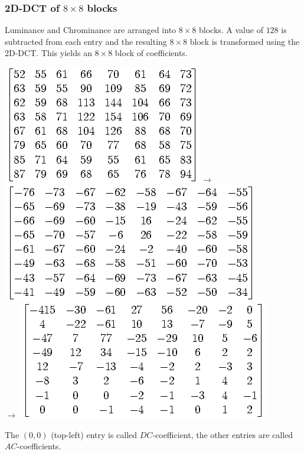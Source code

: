 \documentclass{beamer}
\begin{document}
\begin{frame}
\frametitle{2D-DCT of $8 \times 8$ blocks}
Luminance and Chrominance are arranged into $8\times 8$ blocks. 
A value of $128$ is subtracted from each entry and the resulting 
$8\times 8$ block is transformed using the 2D-DCT. This yields 
an $8\times 8$ block of coefficients. 
\begin{center}

\includegraphics[height=0.22\textwidth]{image-matrix}$\rightarrow$
\includegraphics[height=0.22\textwidth]{subtracted-matrix}\\[6pt]
$\rightarrow$ 
\includegraphics[height=0.22\textwidth]{DCT-matrix}
\end{center}

The $(0,0)$ (top-left) entry is called $DC$-coefficient, the other entries are called $AC$-coefficients.

\end{frame}
\end{document}
